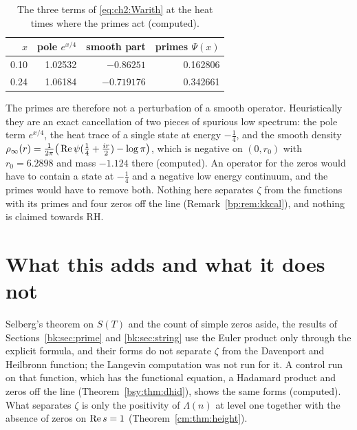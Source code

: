 \begin{table}[ht]
\centering
\small
\begin{tabular}{rrrr}
\toprule
$x$ & pole $e^{x/4}$ & smooth part & primes $\Psi(x)$\\
\midrule
0.10 & 1.02532 & $-0.86251$ & 0.162806\\
0.24 & 1.06184 & $-0.719176$ & 0.342661\\
\bottomrule
\end{tabular}
\caption{The three terms of \eqref{eq:ch2:Warith} at the heat times where the primes act (computed).}\label{bk:tab:born}
\end{table}

The primes are therefore not a perturbation of a smooth operator. Heuristically they are an exact cancellation of two pieces of spurious low spectrum: the pole term $e^{x/4}$, the heat trace of a single state at energy $-\frac14$, and the smooth density $\rho_\infty(r)=\frac1{2\pi}\big(\operatorname{Re}\psi(\frac14+\frac{ir}2)-\log\pi\big)$, which is negative on $(0,r_0)$ with $r_0=6.2898$ and mass $-1.124$ there (computed). An operator for the zeros would have to contain a state at $-\frac14$ and a negative low energy continuum, and the primes would have to remove both. Nothing here separates $\zeta$ from the functions with its primes and four zeros off the line (Remark~\ref{bp:rem:kkcal}), and nothing is claimed towards RH.

\section{What this adds and what it does not}\label{bk:sec:close}

Selberg's theorem on $S(T)$ and the count of simple zeros aside, the results of Sections~\ref{bk:sec:prime} and \ref{bk:sec:string} use the Euler product only through the explicit formula, and their forms do not separate $\zeta$ from the Davenport and Heilbronn function; the Langevin computation was not run for it. A control run on that function, which has the functional equation, a Hadamard product and zeros off the line (Theorem~\ref{bsy:thm:dhid}), shows the same forms (computed). What separates $\zeta$ is only the positivity of $\Lambda(n)$ at level one together with the absence of zeros on $\operatorname{Re} s=1$ (Theorem~\ref{cm:thm:height}).
